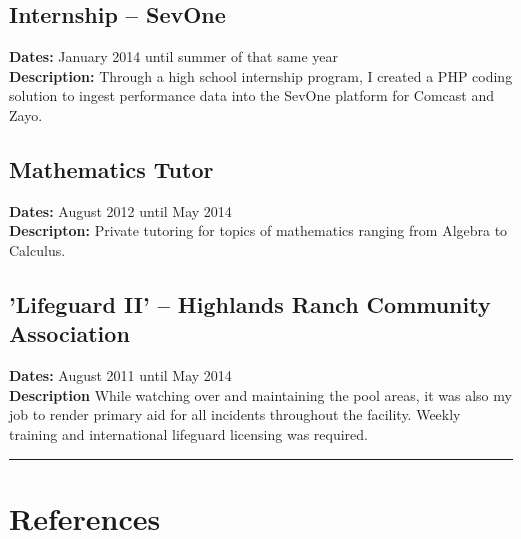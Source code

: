 \documentclass[letterpaper]{article}
\begin{document}
\subsection{Internship -- SevOne}
\noindent\textbf{Dates: } January 2014 until summer of that same year\\
\noindent\textbf{Description: } Through a high school internship program, I created a PHP coding solution to ingest performance data into the SevOne platform for Comcast and Zayo. 

\subsection{Mathematics Tutor}
\textbf{Dates: } August 2012 until May 2014\\
\textbf{Descripton: } Private tutoring for topics of mathematics ranging from Algebra to Calculus.

\subsection{'Lifeguard II' -- Highlands Ranch Community Association}
\noindent\textbf{Dates: } August 2011 until May 2014\\
\noindent\textbf{Description } While watching over and maintaining the pool areas, it was also my job to render primary aid for all incidents throughout the facility. Weekly training and international lifeguard licensing was required.

\noindent\rule{2in}{0.4pt}


\section{References}

\end{document}
